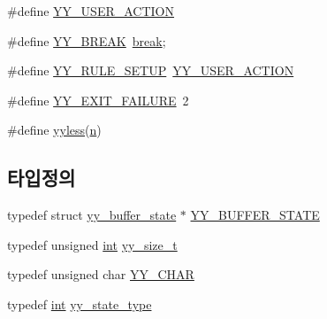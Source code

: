 \begin{DoxyCompactItemize}
\item 
\#define \mbox{\hyperlink{expr-lex_8cpp_a6198b2fcf96178b24ad4efff2a3debb0}{Y\+Y\+\_\+\+U\+S\+E\+R\+\_\+\+A\+C\+T\+I\+ON}}
\item 
\#define \mbox{\hyperlink{expr-lex_8cpp_a3cc40a460ad7df816678bcc05241e84c}{Y\+Y\+\_\+\+B\+R\+E\+AK}}~\mbox{\hyperlink{lq2x_8h_a91cf6fbebedd86150a36e5ac3d5d3bfc}{break}};
\item 
\#define \mbox{\hyperlink{expr-lex_8cpp_a690504b662e4281515bf12722df178ba}{Y\+Y\+\_\+\+R\+U\+L\+E\+\_\+\+S\+E\+T\+UP}}~\mbox{\hyperlink{expr-lex_8cpp_a6198b2fcf96178b24ad4efff2a3debb0}{Y\+Y\+\_\+\+U\+S\+E\+R\+\_\+\+A\+C\+T\+I\+ON}}
\item 
\#define \mbox{\hyperlink{expr-lex_8cpp_ae93e67b85c44f6bd31ead14a552a35c8}{Y\+Y\+\_\+\+E\+X\+I\+T\+\_\+\+F\+A\+I\+L\+U\+RE}}~2
\item 
\#define \mbox{\hyperlink{expr-lex_8cpp_ae65cb72d09db0abdc4b8e8c4d533ab14}{yyless}}(\mbox{\hyperlink{expr-lex_8cpp_aeab71244afb687f16d8c4f5ee9d6ef0e}{n}})
\end{DoxyCompactItemize}
\subsection*{타입정의}
\begin{DoxyCompactItemize}
\item 
typedef struct \mbox{\hyperlink{structyy__buffer__state}{yy\+\_\+buffer\+\_\+state}} $\ast$ \mbox{\hyperlink{expr-lex_8cpp_a4e5bd2d129903df83f3d13effaf8f3e4}{Y\+Y\+\_\+\+B\+U\+F\+F\+E\+R\+\_\+\+S\+T\+A\+TE}}
\item 
typedef unsigned \mbox{\hyperlink{_util_8cpp_a0ef32aa8672df19503a49fab2d0c8071}{int}} \mbox{\hyperlink{expr-lex_8cpp_aa14cc3d400000eef0cd40225fd790cfe}{yy\+\_\+size\+\_\+t}}
\item 
typedef unsigned char \mbox{\hyperlink{expr-lex_8cpp_a1f324b3cb0839eeb90145f0274e6946e}{Y\+Y\+\_\+\+C\+H\+AR}}
\item 
typedef \mbox{\hyperlink{_util_8cpp_a0ef32aa8672df19503a49fab2d0c8071}{int}} \mbox{\hyperlink{expr-lex_8cpp_a9ba7c416f135b0f0c1f4addded4616b5}{yy\+\_\+state\+\_\+type}}
\end{DoxyCompactItemize}
